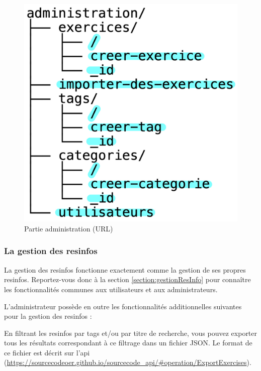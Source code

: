 \begin{figure}[H]
    \includegraphics[width=\textwidth,height=0.25\textheight,keepaspectratio]{images/client/administration.jpeg}
    \centering
    \caption[SourceCode : partie administration (URL)]{Partie administration (URL)}
\end{figure}

\subsubsection{La gestion des \glspl{resinfo}}
\label{section:resInfoAdmin}

La gestion des \glspl{resinfo} fonctionne exactement comme la gestion de ses propres \glspl{resinfo}. Reportez-vous donc à la section \ref{section:gestionResInfo} pour connaître les fonctionnalités communes aux utilisateurs et aux administrateurs.

L'administrateur possède en outre les fonctionnalités additionnelles suivantes pour la gestion des \glspl{resinfo} :

 
En filtrant les \glspl{resinfo} par \glspl{tag} et/ou par titre de recherche, vous pouvez exporter tous les résultats correspondant à ce filtrage dans un fichier JSON. Le format de ce fichier est décrit sur l'api (\url{https://sourcecodeoer.github.io/sourcecode_api/#operation/ExportExercises}).

